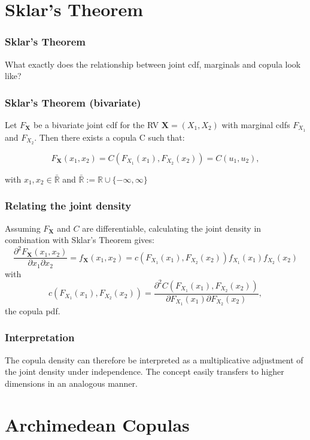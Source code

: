 \documentclass{beamer}
\begin{document}
\section{Sklar's Theorem}
\frame{\sectionpage}
\begin{frame}
\frametitle{Sklar's Theorem}

What exactly does the relationship between joint cdf, marginals and copula look like?



\end{frame}

\begin{frame}
\frametitle{Sklar's Theorem (bivariate)}

Let $F_{\textbf{X}}$ be a bivariate joint cdf for the RV $\textbf{X} = (X_1, X_2)$ with marginal cdfs $F_{X_1}$ and $F_{X_2}$. Then there exists a copula C such that:

\[F_{\textbf{X}}(x_1, x_2) = C(F_{X_1}(x_1), F_{X_2}(x_2)) = C(u_1, u_2),\]

\vspace{3mm}with $x_1, x_2 \in \bar{\mathbb{R}}$ and $\bar{\mathbb{R}} := \mathbb{R} \cup \{-\infty, \infty\}$


\end{frame}

\begin{frame}
\frametitle{Relating the joint density}
Assuming $F_{\textbf{X}}$ and $C$ are differentiable, calculating the joint density in combination with Sklar's Theorem gives:
\[\frac{\partial^2 F_{\textbf{X}}(x_1, x_2)}{\partial x_1 \partial x_2} = f_{\textbf{X}}(x_1, x_2) = c(F_{X_1}(x_1), F_{X_2}(x_2))f_{X_1}(x_1)f_{X_2}(x_2)\] with \[c(F_{X_1}(x_1), F_{X_2}(x_2)) = \frac{\partial^2 C(F_{X_1}(x_1), F_{X_2}(x_2))}{\partial F_{X_1}(x_1) \partial F_{X_2}(x_2)},\] the copula pdf.


\end{frame}

\begin{frame}
\frametitle{Interpretation}

The copula density can therefore be interpreted as a multiplicative adjustment of the joint density under independence.
The concept easily transfers to higher dimensions in an analogous manner.

\end{frame}

\section{Archimedean Copulas}
\end{document}
